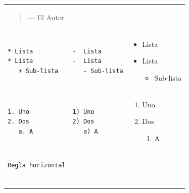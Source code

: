 \documentclass[]{book}
\providecommand{\tightlist}{%
  \setlength{\itemsep}{0pt}\setlength{\parskip}{0pt}}
\theoremstyle{definition}
\theoremstyle{definition}
\theoremstyle{definition}
\theoremstyle{remark}
\begin{document}
\begin{longtable}[]{@{}lll@{}}
\begin{minipage}[t]{0.32\columnwidth}
\begin{quote}
--- El Autor
\end{quote}\strut
\end{minipage}\tabularnewline
\begin{minipage}[t]{0.32\columnwidth}\raggedright\strut
\begin{verbatim}
* Lista
* Lista
   + Sub-lista
\end{verbatim}
\strut
\end{minipage} & \begin{minipage}[t]{0.32\columnwidth}\raggedright\strut
\begin{verbatim}
-  Lista
-  Lista
   - Sub-lista
\end{verbatim}
\strut
\end{minipage} & \begin{minipage}[t]{0.32\columnwidth}\raggedright\strut
\begin{itemize}
\tightlist
\item
  Lista
\item
  Lista

  \begin{itemize}
  \tightlist
  \item
    Sub-lista
  \end{itemize}
\end{itemize}\strut
\end{minipage}\tabularnewline
\begin{minipage}[t]{0.32\columnwidth}\raggedright\strut
\begin{verbatim}
1. Uno
2. Dos
   a. A
\end{verbatim}
\strut
\end{minipage} & \begin{minipage}[t]{0.32\columnwidth}\raggedright\strut
\begin{verbatim}
1) Uno
2) Dos
   a) A
\end{verbatim}
\strut
\end{minipage} & \begin{minipage}[t]{0.32\columnwidth}\raggedright\strut
\begin{enumerate}
\def\labelenumi{\arabic{enumi}.}
\tightlist
\item
  Uno
\item
  Dos

  \begin{enumerate}
  \def\labelenumii{\alph{enumii}.}
  \tightlist
  \item
    A
  \end{enumerate}
\end{enumerate}\strut
\end{minipage}\tabularnewline
\begin{minipage}[t]{0.32\columnwidth}\raggedright\strut
\begin{verbatim}
Regla horizontal


\end{verbatim}
\end{minipage}
\end{longtable}
\end{document}
